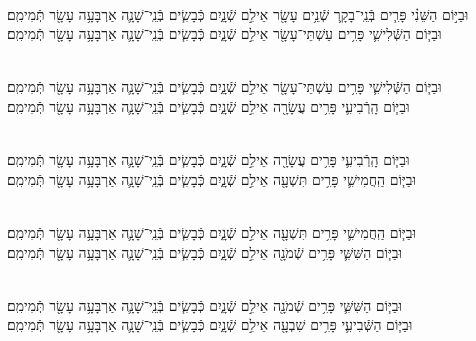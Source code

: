 \documentclass[twoside, openany, parskip=half, 11pt]{book}
\begin{document}
\begin{sometimes}
\\
 וּבַיּ֣וֹם הַשֵּׁנִ֗י פָּרִ֧ים בְּֿנֵֽי־בָקָ֛ר שְֿׁנֵ֥ים עָשָׂ֖ר אֵילִ֣ם שְֿׁנָ֑יִם כְּֿבָשִׂ֧ים בְּֿנֵֽי־שָׁנָ֛ה אַרְבָּעָ֥ה עָשָׂ֖ר תְּֿמִימִֽם׃
\\
וּבַיּ֧וֹם הַשְּֿׁלִישִׁ֛י פָּרִ֥ים עַשְׁתֵּי־עָשָׂ֖ר אֵילִ֣ם שְֿׁנָ֑יִם כְּֿבָשִׂ֧ים בְּֿנֵֽי־שָׁנָ֛ה אַרְבָּעָ֥ה עָשָׂ֖ר תְּֿמִימִֽם׃



\\
וּבַיּ֧וֹם הַשְּֿׁלִישִׁ֛י פָּרִ֥ים עַשְׁתֵּי־עָשָׂ֖ר אֵילִ֣ם שְֿׁנָ֑יִם כְּֿבָשִׂ֧ים בְּֿנֵֽי־שָׁנָ֛ה אַרְבָּעָ֥ה עָשָׂ֖ר תְּֿמִימִֽם׃
\\
 וּבַיּ֧וֹם הָֽרְֿבִיעִ֛י פָּרִ֥ים עֲשָׂרָ֖ה אֵילִ֣ם שְֿׁנָ֑יִם כְּֿבָשִׂ֧ים בְּֿנֵֽי־שָׁנָ֛ה אַרְבָּעָ֥ה עָשָׂ֖ר תְּֿמִימִֽם׃



\\
וּבַיּ֧וֹם הָֽרְֿבִיעִ֛י פָּרִ֥ים עֲשָׂרָ֖ה אֵילִ֣ם שְֿׁנָ֑יִם כְּֿבָשִׂ֧ים בְּֿנֵֽי־שָׁנָ֛ה אַרְבָּעָ֥ה עָשָׂ֖ר תְּֿמִימִֽם׃
\\
 וּבַיּ֧וֹם הַֽחֲמִישִׁ֛י פָּרִ֥ים תִּשְׁעָ֖ה אֵילִ֣ם שְֿׁנָ֑יִם כְּֿבָשִׂ֧ים בְּֿנֵֽי־שָׁנָ֛ה אַרְבָּעָ֥ה עָשָׂ֖ר תְּֿמִימִֽם׃



 \\
וּבַיּ֧וֹם הַֽחֲמִישִׁ֛י פָּרִ֥ים תִּשְׁעָ֖ה אֵילִ֣ם שְֿׁנָ֑יִם כְּֿבָשִׂ֧ים בְּֿנֵֽי־שָׁנָ֛ה אַרְבָּעָ֥ה עָשָׂ֖ר תְּֿמִימִֽם׃
\\
 וּבַיּ֧וֹם הַשִּׁשִּׁ֛י פָּרִ֥ים שְֿׁמֹנָ֖ה אֵילִ֣ם שְֿׁנָ֑יִם כְּֿבָשִׂ֧ים בְּֿנֵֽי־שָׁנָ֛ה אַרְבָּעָ֥ה עָשָׂ֖ר תְּֿמִימִֽם׃



 \\
וּבַיּ֧וֹם הַשִּׁשִּׁ֛י פָּרִ֥ים שְֿׁמֹנָ֖ה אֵילִ֣ם שְֿׁנָ֑יִם כְּֿבָשִׂ֧ים בְּֿנֵֽי־שָׁנָ֛ה אַרְבָּעָ֥ה עָשָׂ֖ר תְּֿמִימִֽם׃
\\
 וּבַיּ֧וֹם הַשְּֿׁבִיעִ֛י פָּרִ֥ים שִׁבְעָ֖ה אֵילִ֣ם שְֿׁנָ֑יִם כְּֿבָשִׂ֧ים בְּֿנֵֽי־שָׁנָ֛ה אַרְבָּעָ֥ה עָשָׂ֖ר תְּֿמִימִֽם׃




\end{sometimes}
\end{document}
